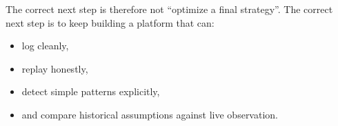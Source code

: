 The correct next step is therefore not ``optimize a final strategy''.
The correct next step is to keep building a platform that can:
\begin{itemize}
  \item log cleanly,
  \item replay honestly,
  \item detect simple patterns explicitly,
  \item and compare historical assumptions against live observation.
\end{itemize}
